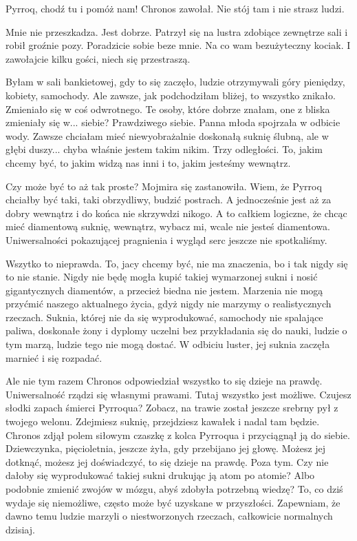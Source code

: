 \ds{} Pyrroq, chodź tu i pomóż nam! \dm{} Chronos zawołał. \dm{} Nie stój tam i nie strasz ludzi. \de{}

\ds{} Mnie nie przeszkadza. Jest dobrze. \dm{} Patrzył się na lustra zdobiące zewnętrze sali i robił groźnie pozy. \dm{}
Poradzicie sobie beze mnie. Na co wam bezużyteczny kociak. I zawołajcie kilku gości, niech się przestraszą.\de{}

\ds{} Byłam w sali bankietowej, gdy to się zaczęło, ludzie otrzymywali góry pieniędzy, kobiety, samochody. Ale zawsze, jak podchodziłam bliżej, to wszystko znikało.
Zmieniało się w coś odwrotnego. Te osoby, które dobrze znałam, one z bliska zmieniały się w... siebie? Prawdziwego siebie. \dm{} Panna młoda spojrzała w odbicie wody.
\dm{} Zawsze chciałam mieć niewyobrażalnie doskonałą suknię ślubną, ale w głębi duszy... chyba właśnie jestem takim nikim. 
Trzy odległości. To, jakim chcemy być, to jakim widzą nas inni i to, jakim jesteśmy wewnątrz. \de{}

\ds{} Czy może być to aż tak proste? \dm{} Mojmira się zastanowiła. \dm{} Wiem, że Pyrroq chciałby być taki, taki obrzydliwy, budzić postrach. 
A jednocześnie jest aż za dobry wewnątrz i do końca nie skrzywdzi nikogo. 
A to całkiem logiczne, że chcąc mieć diamentową suknię, wewnątrz, wybacz mi, wcale nie jesteś diamentowa.
Uniwersalności pokazującej pragnienia i wygląd serc jeszcze nie spotkaliśmy. \de{}

\ds{} Wszytko to nieprawda. To, jacy chcemy być, nie ma znaczenia, bo i tak nigdy się to nie stanie.
Nigdy nie będę mogła kupić takiej wymarzonej sukni i nosić gigantycznych diamentów, a przecież biedna nie jestem. 
Marzenia nie mogą przyćmić naszego aktualnego życia, gdyż nigdy nie marzymy o realistycznych rzeczach.
Suknia, której nie da się wyprodukować, samochody nie spalające paliwa, doskonałe żony i dyplomy uczelni bez przykładania się do nauki, ludzie o tym marzą, ludzie tego nie mogą dostać. \dm{} 
W odbiciu luster, jej suknia zaczęła marnieć i się rozpadać. \de{}

\ds{} Ale nie tym razem \dm{} Chronos odpowiedział \dm{} wszystko to się dzieje na prawdę. Uniwersalność rządzi się własnymi prawami. Tutaj wszystko jest możliwe.
Czujesz słodki zapach śmierci Pyrroqua? Zobacz, na trawie został jeszcze srebrny pył z twojego welonu. 
Zdejmiesz suknię, przejdziesz kawałek i nadal tam będzie. \dm{} Chronos zdjął polem siłowym czaszkę z kolca Pyrroqua i przyciągnął ją do siebie. \dm{}
Dziewczynka, pięcioletnia, jeszcze żyła, gdy przebijano jej głowę. Możesz jej dotknąć, możesz jej doświadczyć, to się dzieje na prawdę. 
Poza tym. Czy nie dałoby się wyprodukować takiej sukni drukując ją atom po atomie? Albo podobnie zmienić zwojów w mózgu, abyś zdobyła potrzebną wiedzę?
To, co dziś wydaje się niemożliwe, często może być uzyskane w przyszłości. Zapewniam, że dawno temu ludzie marzyli o niestworzonych rzeczach, całkowicie normalnych dzisiaj.\de{}

